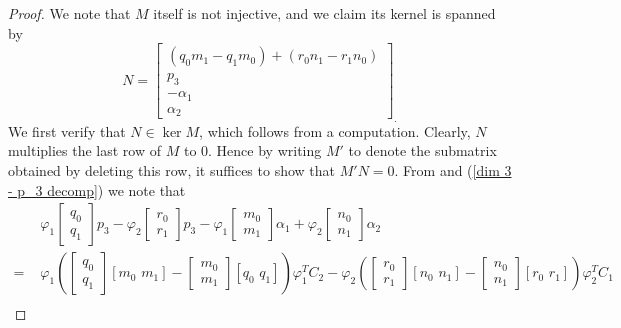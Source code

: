 \documentclass[reqno]{amsart}
\numberwithin{equation}{section}
\theoremstyle{definition}
\def\m{\mathfrak{m}}
\begin{document}
\begin{proof}
We note that $M$ itself is not injective, and we claim its kernel is spanned by
\[
N=\left[
\begin{array}{c}
     (q_0m_1-q_1m_0) + (r_0n_1-r_1n_0) \\
      p_3\\
      -\alpha_1\\
      \alpha_2
\end{array}
\right]_.
\]
We first verify that $N\in \ker M$, which follows from a computation. Clearly, $N$ multiplies the last row of $M$ to $0$. Hence by writing $M'$ to denote the submatrix obtained by deleting this row, it suffices to show that $M'N=0$. From  and (\ref{dim 3 - p_3 decomp}) we note that
\begin{equation}
\begin{aligned}\label{N in kernel computation}
&\,\,\varphi_1\begin{bmatrix}
     q_0\\
     q_1
 \end{bmatrix}p_3 - \varphi_2\begin{bmatrix}
     r_0\\
     r_1
 \end{bmatrix}p_3 -\varphi_1\begin{bmatrix}
         m_0\\m_1
     \end{bmatrix} \alpha_1 +\varphi_2\begin{bmatrix}
         n_0\\n_1
     \end{bmatrix}\alpha_2\\[1ex]
     =&\,\, \varphi_1\left(\begin{bmatrix}
     q_0\\
     q_1
 \end{bmatrix}[m_0\,\,m_1] - \begin{bmatrix}
         m_0\\m_1
     \end{bmatrix} [q_0\,\,q_1]\right)\varphi_1^TC_2 - \varphi_2\left(\begin{bmatrix}
     r_0\\
     r_1
 \end{bmatrix}[n_0\,\,n_1] - \begin{bmatrix}
         n_0\\n_1
     \end{bmatrix}[r_0\,\,r_1]\right)\varphi_2^TC_1 \\[1ex]

\end{aligned}
\end{equation}
\end{proof}
\end{document}
